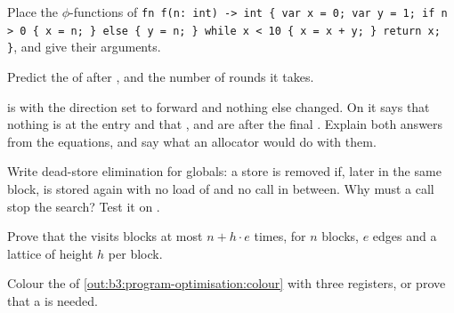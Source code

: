 \begin{exercise}[$\star$]\label{exo:b3:program-optimisation:3}
Place the $\phi$-functions of \texttt{fn f(n:\ int) -> int \{ var x = 0; var y = 1; if n > 0 \{ x = n; \} else \{ y = n; \} while x < 10 \{ x = x + y; \} return x; \}}, and give their arguments.
\end{exercise}

\begin{exercise}[$\star$]\label{exo:b3:program-optimisation:4}
Predict the  of  after , and the number of rounds it takes.
\end{exercise}

\begin{exercise}[$\star\star$]\label{exo:b3:program-optimisation:5}
 is  with the direction set to forward and nothing else changed. On  it says that nothing is  at the entry and that ,  and  are  after the final . Explain both answers from the equations, and say what an allocator would do with them.
\end{exercise}

\begin{exercise}[$\star\star$]\label{exo:b3:program-optimisation:6}
Write dead-store elimination for globals: a store  is removed if, later in the same block,  is stored again with no load of  and no call in between. Why must a call stop the search? Test it on .
\end{exercise}

\begin{exercise}[$\star\star$]\label{exo:b3:program-optimisation:7}
Prove that the  visits blocks at most $n + h \cdot e$ times, for $n$ blocks, $e$ edges and a lattice of height $h$ per block.
\end{exercise}

\begin{exercise}[$\star\star$]\label{exo:b3:program-optimisation:8}
Colour the  of \cref{out:b3:program-optimisation:colour} with three registers, or prove that a  is needed.
\end{exercise}

